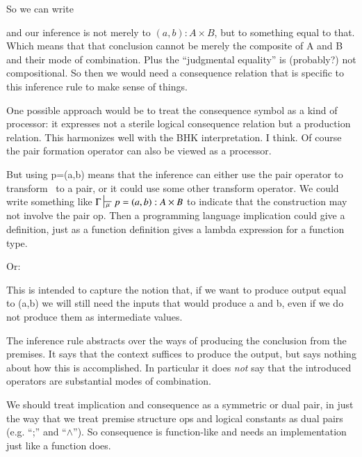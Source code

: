 \documentclass{article}
\begin{document}
So we can write


and our inference is not merely to \((a,b):A\times B\), but to
something equal to that. Which means that that conclusion cannot be
merely the composite of A and B and their mode of combination. Plus
the ``judgmental equality'' is (probably?) not compositional. So then
we would need a consequence relation that is specific to this
inference rule to make sense of things.

One possible approach would be to treat the consequence symbol as a
kind of processor: it expresses not a sterile logical consequence
relation but a production relation. This harmonizes well with the BHK
interpretation. I think. Of course the pair formation operator can
also be viewed as a processor.

But using p=(a,b) means that the inference can either use the pair
operator to transform \ContextG\ to a pair, or it could use some other
transform operator. We could write something like
\(\Gamma\sststile{\mu}{} p=(a,b): A\times B\) to indicate that the
construction may not involve the pair op. Then a programming language
implication could give a definition, just as a function definition
gives a lambda expression for a function type.

Or:


This is intended to capture the notion that, if we want to produce
output equal to (a,b) we will still need the inputs that would produce
a and b, even if we do not produce them as intermediate values.

The inference rule abstracts over the ways of producing the conclusion
from the premises. It says that the context suffices to produce the
output, but says nothing about how this is accomplished. In particular
it does \textit{not} say that the introduced operators are substantial
modes of combination.

We should treat implication and consequence as a symmetric or dual
pair, in just the way that we treat premise structure ops and logical
constants as dual pairs (e.g. ``;'' and ``\(\land\)''). So consequence
is function-like and needs an implementation just like a function
does.
\end{document}

